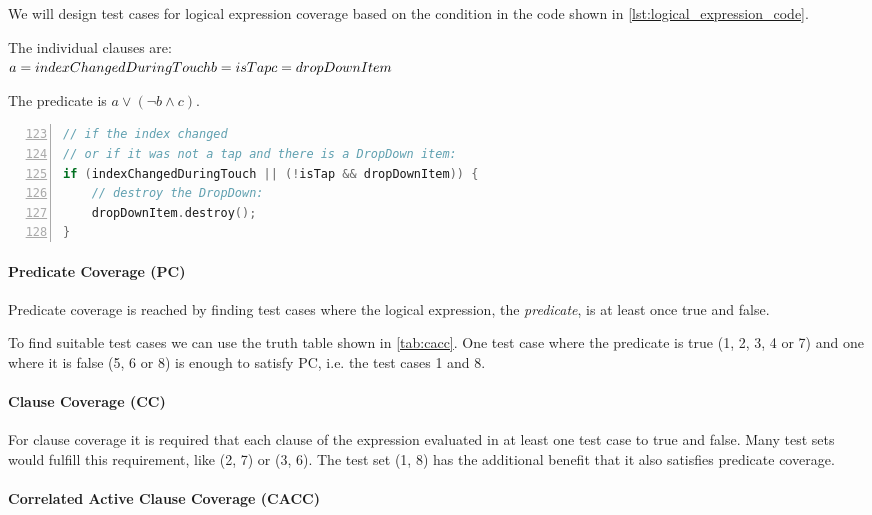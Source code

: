 \documentclass{scrreprt}
\begin{document}
We will design test cases for logical expression coverage based on the condition in the code shown in \vref{lst:logical_expression_code}.

The individual clauses are:\\
$
a = indexChangedDuringTouch\\
b = isTap\\
c = dropDownItem\\
$

The predicate is $a \lor (\lnot b \land c)$.

\bigskip
\begin{lstlisting}[language=C++,
					numbers=left,
					firstnumber=123,
					directivestyle={\color{black}}
					emph={int,char,double,float,unsigned},
					emphstyle={\color{blue}},
					caption=qml/CustomControls/ComboBox2.qml,
					label=lst:logical_expression_code]
// if the index changed
// or if it was not a tap and there is a DropDown item:
if (indexChangedDuringTouch || (!isTap && dropDownItem)) {
	// destroy the DropDown:
	dropDownItem.destroy();
}
\end{lstlisting}
\bigskip

\paragraph{Predicate Coverage (PC)}

Predicate coverage is reached by finding test cases where the logical expression, the \textit{predicate}, is at least once true and false.

To find suitable test cases we can use the truth table shown in \vref{tab:cacc}. One test case where the predicate is true (1, 2, 3, 4 or 7) and one where it is false (5, 6 or 8) is enough to satisfy PC, i.e. the test cases 1 and 8.

\paragraph{Clause Coverage (CC)}

For clause coverage it is required that each clause of the expression evaluated in at least one test case to true and false. Many test sets would fulfill this requirement, like (2, 7) or (3, 6). The test set (1, 8) has the additional benefit that it also satisfies predicate coverage.

\paragraph{Correlated Active Clause Coverage (CACC)}
\end{document}
